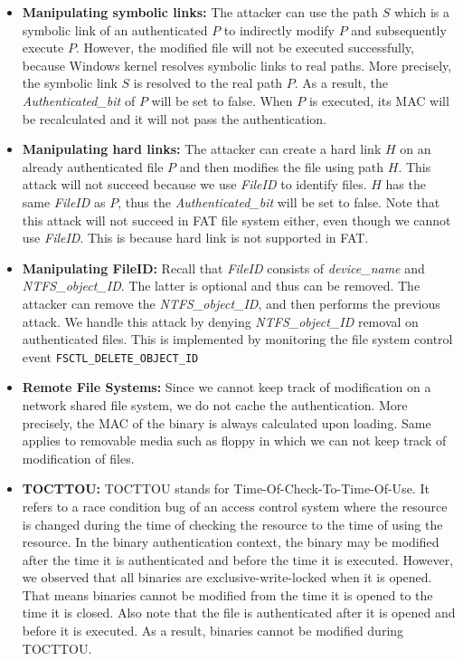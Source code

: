 \begin{itemize}
\item {\bf Manipulating symbolic links:}
The attacker can use the path $S$ which is a symbolic link of an authenticated $P$
to indirectly modify $P$ and subsequently execute $P$.
However, the modified file will not be executed successfully, because
Windows kernel resolves symbolic links to real paths.
More precisely, the symbolic link $S$ is resolved to the real path $P$.
As a result, the {\it Authenticated\_bit} of $P$ will be set to false.
When $P$ is executed, its MAC will be recalculated and it will not pass
the authentication.

\item {\bf Manipulating hard links:}
The attacker can create a hard link $H$ on an already authenticated file $P$
and then modifies the file using path $H$.
This attack will not succeed because we use {\it FileID} to identify files.
$H$ has the same {\it FileID} as $P$,
thus the {\it Authenticated\_bit} will be set to false.
Note that this attack will not succeed in FAT file system either,
even though we cannot use {\it FileID}.
This is because hard link is not supported in FAT.

\item {\bf Manipulating FileID:}
Recall that {\it FileID} consists of {\it device\linebreak[0]\_\linebreak[0]name}
and {\it NTFS\linebreak[0]\_\linebreak[0]object\linebreak[0]\_\linebreak[0]ID}.
The latter is optional and thus can be removed.
The attacker can remove the {\it NTFS\_object\_ID}, and then performs the previous attack.
We handle this attack by denying {\it NTFS\_object\_ID} removal on authenticated files.
This is implemented by monitoring the file system control event {\tt FSCTL\_DELETE\_OBJECT\_ID}

\item {\bf Remote File Systems:}
Since we cannot keep track of modification on a network shared file system,
we do not cache the authentication.
More precisely, the MAC of the binary is always calculated upon loading.
Same applies to removable media such as floppy in which we can not
keep track of modification of files.

\item {\bf TOCTTOU:}
TOCTTOU stands for Time-Of-Check-To-Time-Of-Use.
It refers to a race condition bug of an access control system
where the resource is changed during the time
of checking the resource to the time of using the resource.
In the binary authentication context, the binary may be modified
after the time it is authenticated and before the time it is executed.
However, we observed that all binaries are exclusive-write-locked
when it is opened.
That means binaries cannot be modified from the time it is opened
to the time it is closed.
Also note that the file is authenticated after it is opened and before
it is executed.
As a result, binaries cannot be modified during TOCTTOU.


\end{itemize}
